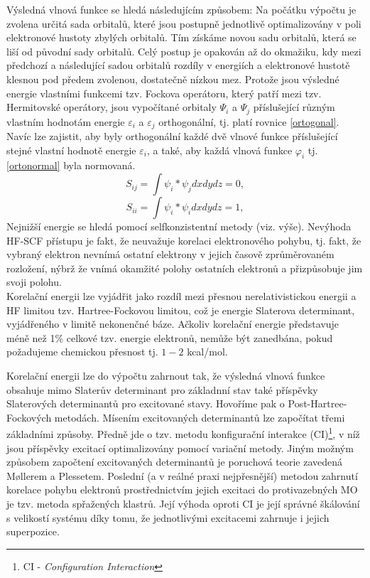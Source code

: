 \documentclass[
digital, %
table,   %
lof,     %
lot,     %
oneside,
]{fithesis3}
\begin{document}
Výsledná vlnová funkce se hledá následujícím způsobem: Na počátku výpočtu je zvolena určitá sada orbitalů, které jsou postupně jednotlivě optimalizovány v poli elektronové hustoty zbylých orbitalů. Tím získáme novou sadu orbitalů, která se liší od původní sady orbitalů. Celý postup je opakován až do okmažiku, kdy mezi předchozí a následující sadou orbitalů rozdíly v energiích a elektronové hustotě klesnou pod předem zvolenou, dostatečně nízkou mez. Protože jsou výsledné energie vlastními funkcemi tzv. Fockova operátoru, který patří mezi tzv. Hermitovské operátory, jsou vypočítané orbitaly $\Psi_i$ a $\Psi_j$ příslušející různým vlastním hodnotám energie $\varepsilon_i $ a $\varepsilon_j$ orthogonální, tj. platí rovnice \ref{ortogonal}. Navíc lze zajistit, aby byly orthogonální každé dvě vlnové funkce příslušející stejné vlastní hodnotě energie $\varepsilon_i$, a také, aby každá vlnová funkce $\varphi_i$ tj. \ref{ortonormal} byla normovaná.
\begin{equation}
S_{ij} = \int \psi_i * \psi_j dx dy dz = 0,
\label{ortogonal}
\end{equation}
\begin{equation}
S_{ii} = \int \psi_i * \psi_i dx dy dz = 1,
\label{ortonormal}
\end{equation}
Nejnižší energie se hledá pomocí selfkonzistentní metody (viz. výše). Nevýhoda HF-SCF přístupu je fakt, že neuvažuje korelaci elektronového pohybu, tj. fakt, že vybraný elektron nevnímá ostatní elektrony v jejich časově zprůměrovaném rozložení, nýbrž že vnímá okamžité polohy ostatních elektronů a přizpůsobuje jim svoji polohu.\\

Korelační energii lze vyjádřit jako rozdíl mezi přesnou nerelativistickou energii a HF limitou tzv. Hartree-Fockovou limitou, což je energie Slaterova determinant, vyjádřeného v limitě nekonenčné báze. Ačkoliv korelační energie představuje méně než 1\% celkové tzv. energie elektronů, nemůže být zanedbána, pokud požadujeme chemickou přesnost tj. $1-2$ kcal/mol.

Korelační energii lze do výpočtu zahrnout tak, že výsledná vlnová funkce obsahuje mimo Slaterův determinant pro základnní stav také příspěvky Slaterových determinantů pro excitované stavy. Hovoříme pak o Post-Hartree-Fockových metodách. Mísením excitovaných determinantů lze započítat třemi základními způsoby. Předně jde o tzv. metodu konfigurační interakce (CI)\footnote{CI - \textit{Configuration Interaction}}, v níž jsou příspěvky excitací optimalizovány pomocí variační metody. Jiným možným způsobem započtení excitovaných determinantů je poruchová teorie zavedená M{\o}llerem a Plessetem. Poslední (a v reálné praxi nejpřesnější) metodou zahrnutí korelace pohybu elektronů prostřednictvím jejich excitaci do protivazebných MO je tzv. metoda spřažených klastrů. Její výhoda oproti CI je její správné škálování s velikostí systému díky tomu, že jednotlivými excitacemi zahrnuje i jejich superpozice.
\end{document}
